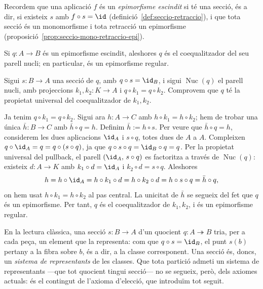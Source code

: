 Recordem que una aplicació \(f\) és un \emph{epimorfisme escindit} si té una secció, és a dir, si existeix \(s\) amb \(f\circ s=\id\) (definició~\ref{def:seccio-retraccio}), i que tota secció és un monomorfisme i tota retracció un epimorfisme (proposició~\ref{prop:seccio-mono-retraccio-epi}).

\begin{proposicio}\label{prop:escindit-regular}
Si \(q\colon A\to B\) és un epimorfisme escindit, aleshores \(q\) és el coequalitzador del seu parell nucli; en particular, és un epimorfisme regular.
\end{proposicio}

\begin{prova}
Sigui \(s\colon B\to A\) una secció de \(q\), amb \(q\circ s=\id_B\), i sigui \(\operatorname{Nuc}(q)\) el parell nucli, amb projeccions \(k_1,k_2\colon K\to A\) i \(q\circ k_1=q\circ k_2\). Comprovem que \(q\) té la propietat universal del coequalitzador de \(k_1,k_2\).

Ja tenim \(q\circ k_1=q\circ k_2\). Sigui ara \(h\colon A\to C\) amb \(h\circ k_1=h\circ k_2\); hem de trobar una única \(\bar h\colon B\to C\) amb \(\bar h\circ q=h\). Definim \(\bar h:=h\circ s\). Per veure que \(\bar h\circ q=h\), considerem les dues aplicacions \(\id_A\) i \(s\circ q\), totes dues de \(A\) a \(A\). Compleixen \(q\circ\id_A=q=q\circ(s\circ q)\), ja que \(q\circ s\circ q=\id_B\circ q=q\). Per la propietat universal del pullback, el parell \((\id_A,\,s\circ q)\) es factoritza a través de \(\operatorname{Nuc}(q)\): existeix \(d\colon A\to K\) amb \(k_1\circ d=\id_A\) i \(k_2\circ d=s\circ q\). Aleshores
\[
h=h\circ\id_A=h\circ k_1\circ d=h\circ k_2\circ d=h\circ s\circ q=\bar h\circ q,
\]
on hem usat \(h\circ k_1=h\circ k_2\) al pas central. La unicitat de \(\bar h\) se segueix del fet que \(q\) és un epimorfisme. Per tant, \(q\) és el coequalitzador de \(k_1,k_2\), i és un epimorfisme regular.
\end{prova}

\begin{observacio}\label{obs:seccio-representants}
En la lectura clàssica, una secció \(s\colon B\to A\) d'un quocient \(q\colon A\twoheadrightarrow B\) tria, per a cada peça, un element que la representa: com que \(q\circ s=\id_B\), el punt \(s(b)\) pertany a la fibra sobre \(b\), és a dir, a la classe corresponent. Una secció és, doncs, un \emph{sistema de representants} de les classes. Que tota partició admeti un sistema de representants ---que tot quocient tingui secció--- no se segueix, però, dels axiomes actuals: és el contingut de l'axioma d'elecció, que introduïm tot seguit.
\end{observacio}

